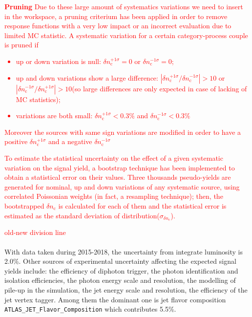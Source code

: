 \textcolor{red}{\textbf{Pruning} Due to these large amount of systematics variations we need to insert in the workspace, a pruning criterium has been applied in order to remove response functions with a very low impact or an incorrect evaluation due to limited MC statistic. A systematic variation for a certain category-process couple is pruned if
\begin{itemize}
	\item up or down variation is null: $\delta n_{\mathrm{c}}^{+1\sigma}=0$ or $\delta n_{\mathrm{c}}^{-1\sigma}=0$;
	\item up and down variations show a large difference: $|\delta n_{\mathrm{c}}^{+1\sigma}/\delta n_{\mathrm{c}}^{-1\sigma}|>10$ or $|\delta n_{\mathrm{c}}^{-1\sigma}/\delta n_{\mathrm{c}}^{+1\sigma}|>10$(so large differences are only expected in case of lacking of MC statistics);
	\item variations are both small: $\delta n_{\mathrm{c}}^{+1\sigma}<0.3\%$ and $\delta n_{\mathrm{c}}^{-1\sigma}<0.3\%$
\end{itemize}
Moreover the sources with same sign variations are modified in order to have a positive $\delta n_{\mathrm{c}}^{+1\sigma}$ and a negative $\delta n_{\mathrm{c}}^{-1\sigma}$}

\textcolor{red}{To estimate the statistical uncertainty on the effect of a given systematic variation on the signal yield, a bootstrap technique has been implemented to obtain a statistical error on their values. Three thousands pseudo-yields are generated for nominal, up and down variations of any systematic source, using correlated Poissonian weights (in fact, a resampling technique); then, the bootstrapped $\delta n_{\mathrm{c}}$ is calculated for each of them and the statistical error is estimated as the standard deviation of distribution($\sigma_{\delta n_{\mathrm{c}}}$).}

\textcolor{red}{old-new division line}


\paragraph{} With data taken during 2015-2018, the uncertainty from integrate luminosity is 2.0\%. Other sources of experimental uncertainty affecting the expected signal yields include: the efficiency of diphoton trigger, the photon identification and isolation efficiencies, the photon energy scale and resolution, the modelling of pile-up in the simulation, the jet energy scale and resolution, the efficiency of the jet vertex tagger. Among them the dominant one is jet flavor composition \texttt{ATLAS\_JET\_Flavor\_Composition} which contributes 5.5\%. \\

